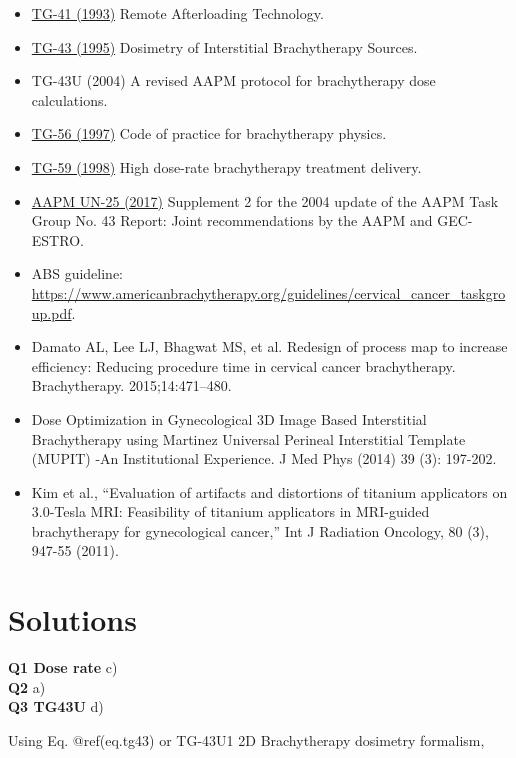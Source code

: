 \documentclass[]{book}
\providecommand{\tightlist}{%
  \setlength{\itemsep}{0pt}\setlength{\parskip}{0pt}}
\theoremstyle{definition}
\theoremstyle{definition}
\theoremstyle{definition}
\theoremstyle{remark}
\begin{document}
\begin{itemize}
\tightlist
\item
  \href{https://www.aapm.org/pubs/reports/rpt_41.pdf}{TG-41 (1993)}
  Remote Afterloading Technology.
\item
  \href{https://www.aapm.org/pubs/reports/detail.asp?docid=50}{TG-43
  (1995)} Dosimetry of Interstitial Brachytherapy Sources.
\item
  TG-43U (2004) A revised AAPM protocol for brachytherapy dose
  calculations.
\item
  \href{https://www.aapm.org/pubs/reports/detail.asp?docid=58\#}{TG-56
  (1997)} Code of practice for brachytherapy physics.
\item
  \href{https://pdfs.semanticscholar.org/5a32/c14e0720d3e5af0747e5a191845683b3feca.pdf}{TG-59
  (1998)} High dose-rate brachytherapy treatment delivery.
\item
  \href{https://www.aapm.org/pubs/reports/detail.asp?docid=167}{AAPM
  UN-25 (2017)} Supplement 2 for the 2004 update of the AAPM Task Group
  No. 43 Report: Joint recommendations by the AAPM and GEC-ESTRO.
\item
  ABS guideline:
  \url{https://www.americanbrachytherapy.org/guidelines/cervical_cancer_taskgroup.pdf}.
\item
  Damato AL, Lee LJ, Bhagwat MS, et al. Redesign of process map to
  increase efficiency: Reducing procedure time in cervical cancer
  brachytherapy. Brachytherapy. 2015;14:471--480.
\item
  Dose Optimization in Gynecological 3D Image Based Interstitial
  Brachytherapy using Martinez Universal Perineal Interstitial Template
  (MUPIT) -An Institutional Experience. J Med Phys (2014) 39 (3):
  197-202.
\item
  Kim et al., ``Evaluation of artifacts and distortions of titanium
  applicators on 3.0-Tesla MRI: Feasibility of titanium applicators in
  MRI-guided brachytherapy for gynecological cancer,'' Int J Radiation
  Oncology, 80 (3), 947-55 (2011).
\end{itemize}

\section{Solutions}\label{solutions-1}

\textbf{Q1 Dose rate} c)\\
\textbf{Q2} a)\\
\textbf{Q3 TG43U } d)

Using Eq. @ref(eq.tg43) or TG-43U1 2D Brachytherapy dosimetry formalism,
\end{document}
